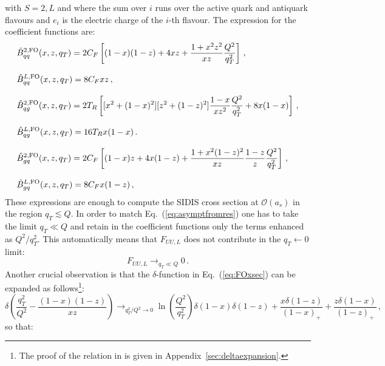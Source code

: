 \documentclass[10pt,a4paper]{article}
\begin{document}
with $S=2,L$ and where the sum over $i$ runs over the active quark and
antiquark flavours and $e_i$ is the electric charge of the $i$-th
flavour. The expression for the coefficient functions are:
\begin{equation}\label{eq:Bacchettaetal}
\begin{array}{l}
\displaystyle \hat{B}_{qq}^{2,\rm FO}(x,z,q_T) = 2C_F\left[(1-x)(1-z)+4xz+\frac{1+x^2z^2}{xz}\frac{Q^2}{q_T^2}\right]\,,\\
\\
\displaystyle \hat{B}_{qq}^{L,\rm FO}(x,z,q_T) = 8C_Fxz\,,\\
\\
\displaystyle \hat{B}_{qg}^{2,\rm FO}(x,z,q_T) = 2T_R\left[[x^2+(1-x)^2][z^2+(1-z)^2]\frac{1-x}{xz^2}\frac{Q^2}{q_T^2} +8x(1-x)\right]\,,\\
\\
\displaystyle \hat{B}_{qg}^{L,\rm FO}(x,z,q_T) = 16T_Rx(1-x)\,.\\
\\
\displaystyle \hat{B}_{gq}^{2,\rm FO}(x,z,q_T) = 2C_F\left[(1-x)z+4x(1-z)+\frac{1+x^2(1-z)^2}{xz}\frac{1-z}{z}\frac{Q^2}{q_T^2}\right]\,,\\
\\
\displaystyle \hat{B}_{gq}^{L,\rm FO}(x,z,q_T) = 8C_Fx(1-z)\,,
\end{array}
\end{equation}
These expressions are enough to compute the SIDIS cross section at
$\mathcal{O}(a_s)$ in the region $q_T \lesssim Q$. In order to match
Eq.~(\ref{eq:asymptfromres}) one has to take the limit $q_T\ll Q$ and
retain in the coefficient functions only the terms enhanced as
$Q^2/q_T^2$. This automatically means that $F_{UU,L}$ does not
contribute in the $q_T\leftarrow 0$ limit:
\begin{equation}
F_{UU,L}\mathop{\longrightarrow}_{q_T\ll Q} 0\,.
\end{equation}
Another crucial observation is that the $\delta$-function in
Eq.~(\ref{eq:FOxsec}) can be expanded as follows\footnote{The proof of
  the relation in is given in Appendix~\ref{sec:deltaexpansion}.}:
\begin{equation}\label{eq:deltaexpansion}
  \delta\left(\frac{q_T^2}{Q^2}-\frac{(1-x)(1-z)}{xz}\right)
  \mathop{\longrightarrow}_{q_T^2/Q^2\rightarrow0}\ln\left(\frac{Q^2}{q_T^2}\right)\delta(1-x) \delta(1-z) +
  \frac{x\delta(1-z)}{(1-x)_+}+ \frac{z\delta(1-x)}{(1-z)_+}\,,
\end{equation}
so that:
\end{document}
